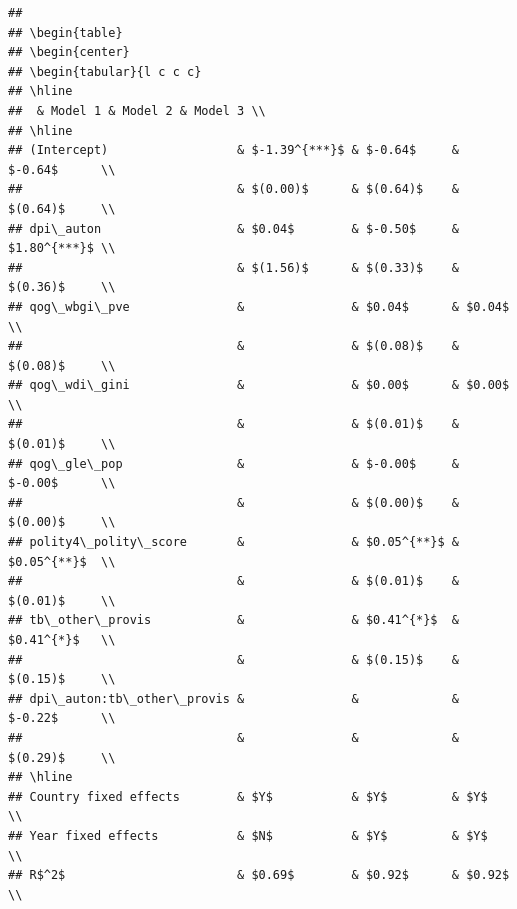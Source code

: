 \documentclass[
]{article}
\begin{document}
\begin{verbatim}
## 
## \begin{table}
## \begin{center}
## \begin{tabular}{l c c c}
## \hline
##  & Model 1 & Model 2 & Model 3 \\
## \hline
## (Intercept)                  & $-1.39^{***}$ & $-0.64$     & $-0.64$      \\
##                              & $(0.00)$      & $(0.64)$    & $(0.64)$     \\
## dpi\_auton                   & $0.04$        & $-0.50$     & $1.80^{***}$ \\
##                              & $(1.56)$      & $(0.33)$    & $(0.36)$     \\
## qog\_wbgi\_pve               &               & $0.04$      & $0.04$       \\
##                              &               & $(0.08)$    & $(0.08)$     \\
## qog\_wdi\_gini               &               & $0.00$      & $0.00$       \\
##                              &               & $(0.01)$    & $(0.01)$     \\
## qog\_gle\_pop                &               & $-0.00$     & $-0.00$      \\
##                              &               & $(0.00)$    & $(0.00)$     \\
## polity4\_polity\_score       &               & $0.05^{**}$ & $0.05^{**}$  \\
##                              &               & $(0.01)$    & $(0.01)$     \\
## tb\_other\_provis            &               & $0.41^{*}$  & $0.41^{*}$   \\
##                              &               & $(0.15)$    & $(0.15)$     \\
## dpi\_auton:tb\_other\_provis &               &             & $-0.22$      \\
##                              &               &             & $(0.29)$     \\
## \hline
## Country fixed effects        & $Y$           & $Y$         & $Y$          \\
## Year fixed effects           & $N$           & $Y$         & $Y$          \\
## R$^2$                        & $0.69$        & $0.92$      & $0.92$       \\

\end{verbatim}
\end{document}
